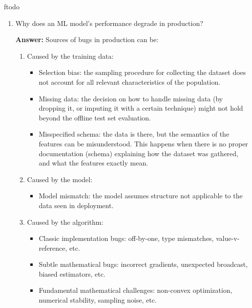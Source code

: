ƒtodo\documentclass{article}
\newenvironment{QandA}{\begin{enumerate}[label=\arabic*.]}{\end{enumerate}}
\newenvironment{ListAlph}{\begin{enumerate}[label=(\alph*)]}{\end{enumerate}}
\newenvironment{answer}{\par\normalfont \textbf{Answer:}}{}
\begin{document}
\begin{QandA}
    \item Why does an ML model’s performance degrade in production?
    \begin{answer}
        Sources of bugs in production can be:
        \begin{ListAlph}
            \item Caused by the training data:
            \begin{itemize}
                \item Selection bias: the sampling procedure for collecting the dataset does not account for all relevant characteristics of the population. 
                \item Missing data: the decision on how to handle missing data (by dropping it, or imputing it with a certain technique) might not hold beyond the offline test set evaluation.
                \item Misspecified schema: the data is there, but the semantics of the features can be misunderstood. This happens when there is no proper documentation (schema) explaining how the dataset was gathered, and what the features exactly mean.
            \end{itemize}
            
            \item Caused by the model:
            \begin{itemize}
                \item Model mismatch: the model assumes structure not applicable to the data seen in deployment.
            \end{itemize}

            \item Caused by the algorithm:
            \begin{itemize}
                \item Classic implementation bugs: off-by-one, type mismatches, value-v-reference, etc.
                \item Subtle mathematical bugs: incorrect gradients, unexpected broadcast, biased estimators, etc.
                \item Fundamental mathematical challenges: non-convex optimization, numerical stability, sampling noise, etc.
            \end{itemize}


\end{ListAlph}
\end{answer}
\end{QandA}
\end{document}
